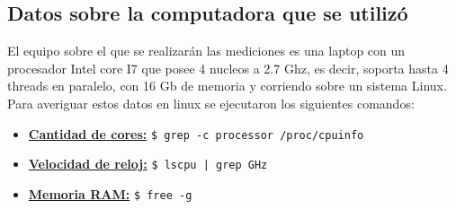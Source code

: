 \subsection{Datos sobre la computadora que se utilizó}
    El equipo sobre el que se realizarán las mediciones es una laptop con un
    procesador Intel core I7 que posee 4 nucleos a 2.7 Ghz, es decir, soporta
    hasta 4 threads en paralelo, con 16 Gb de memoria y corriendo sobre un
    sistema Linux.\\
    Para averiguar estos datos en linux se ejecutaron los siguientes comandos:\\
    \begin{itemize}
        \item \underline{\textbf{Cantidad de cores:}} \lstinline[columns=fixed]{$ grep -c processor /proc/cpuinfo}
        \item \underline{\textbf{Velocidad de reloj:}} \lstinline[columns=fixed]{$ lscpu | grep GHz}
        \item \underline{\textbf{Memoria RAM:}} \lstinline[columns=fixed]{$ free -g}
    \end{itemize}